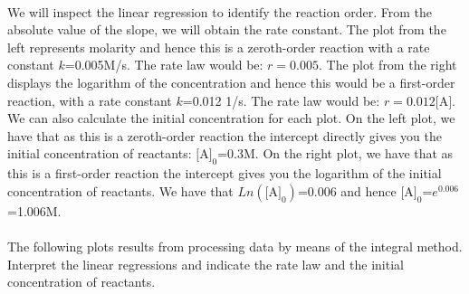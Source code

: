 \documentclass[main.tex]{subfiles}
\begin{document}
\begin{description}
\begin{example}
\begin{center}
\begin{tikzpicture}
\end{tikzpicture}
\end{center}
\\
We will inspect the linear regression to identify the reaction order. From the absolute value of the slope, we will obtain the rate constant. The plot from the left represents molarity and hence this is a zeroth-order reaction with a rate constant $k$=0.005M/s. The rate law would be: $r=0.005$. The plot from the right displays the logarithm of the concentration and hence this would be a first-order reaction, with a rate constant $k$=0.012 1/s. The rate law would be: $r=0.012\text{[A]}$. We can also calculate the initial concentration for each plot. On the left plot, we have that as this is a zeroth-order reaction the intercept directly gives you the initial concentration of reactants: $\text{[A]}_0$=0.3M. On the right plot, we have that as this is a first-order reaction the intercept gives you the logarithm of the initial concentration of reactants. We have that $Ln(\text{[A]}_0)$=0.006 and hence $\text{[A]}_0$=$e^{0.006}$=1.006M.\\\faDiamond\ \\
The following plots results from processing data by means of the integral method. Interpret the linear regressions and indicate the rate law and the initial concentration of reactants.
\begin{center}
\end{center}
\end{example}
\end{description}
\end{document}
